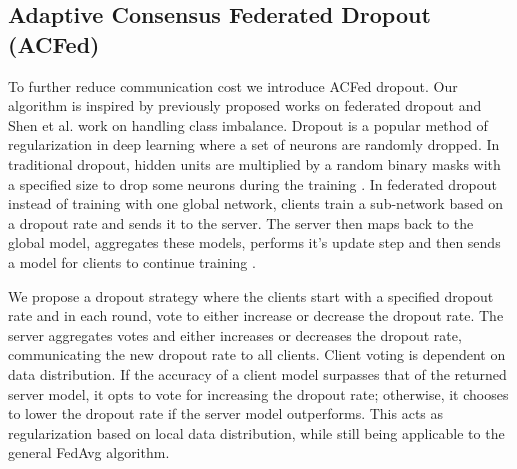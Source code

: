 \documentclass{article}
\begin{document}
\subsection{Adaptive Consensus Federated Dropout (ACFed)}

To further reduce communication cost we introduce ACFed dropout. Our algorithm is inspired by previously proposed works on federated dropout\cite{wen2022federated,nader2020adaptive} and Shen et al.\cite{shen2021agnostic} work on handling class imbalance. Dropout is a popular method of regularization in deep learning where a set of neurons are randomly dropped. In traditional dropout, hidden units are multiplied by a random binary masks with a specified size to drop some neurons during the training \cite{baldi2014dropout}. In federated dropout instead of training with one global network, clients train a sub-network based on a dropout rate and sends it to the server. The server then maps back to the global model, aggregates these models, performs it's update step and then sends a model for clients to continue training \cite{wen2022federated}. 

We propose a dropout strategy where the clients start with a specified dropout rate and in each round, vote to either increase or decrease the dropout rate. The server aggregates votes and either increases or decreases the dropout rate, communicating the new dropout rate to all clients. Client voting is dependent on data distribution. If the accuracy of a client model surpasses that of the returned server model, it opts to vote for increasing the dropout rate; otherwise, it chooses to lower the dropout rate if the server model outperforms. This acts as regularization based on local data distribution, while still being applicable to the general FedAvg algorithm. 
\end{document}
